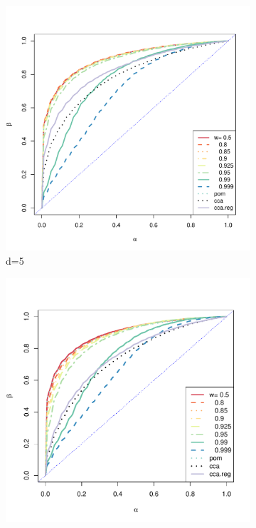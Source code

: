 \documentclass[11pt]{article} %
\begin{document}
\begin{figure}
\begin{subfigure}[b]{0.5\textwidth}
                  \includegraphics[width=\textwidth]{ROC-d-5.pdf}
                \caption{d=5}
                \label{fig:ROC-d-5}
        \end{subfigure}      
        \begin{subfigure}[b]{0.47\textwidth}             
               \includegraphics[width=\textwidth]{ROC-d-7.pdf}

\end{subfigure}
\end{figure}
\end{document}
